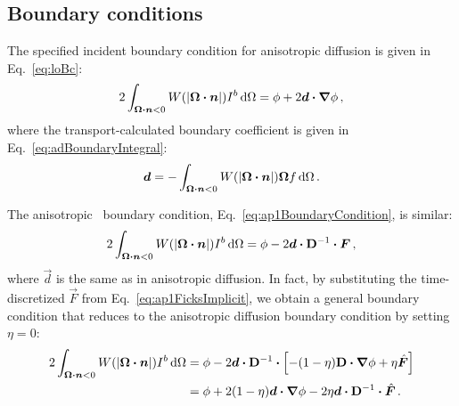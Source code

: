\subsection{Boundary conditions}\label{sec:discreteDiagBc}

The specified incident boundary condition for anisotropic diffusion is given in
Eq.~\eqref{eq:loBc}:
\begin{equation*}
2\int_{\bm{\Omega}\bm{\cdot}\bm{n} < 0} W(\left| \bm{\Omega}\bm{\cdot}\bm{n} \right|)
I^b \mathop{}\!\mathrm{d}\Omega
=
\phi
+ 2 \bm{d} \bm{\cdot} \bm{\nabla} \phi\,,
\end{equation*}
where the transport-calculated boundary coefficient is given in
Eq.~\eqref{eq:adBoundaryIntegral}:
\begin{equation*}
  \bm{d} = -\int_{\bm{\Omega}\bm{\cdot}\bm{n} < 0} W(\left| \bm{\Omega}\bm{\cdot}\bm{n} \right|)
\bm{\Omega} f \mathop{}\!\mathrm{d}\Omega\,.
\end{equation*}

The anisotropic \Pone\ boundary condition, Eq.~\eqref{eq:ap1BoundaryCondition},
is similar:
\begin{equation*}
  2 \int_{\bm{\Omega}\bm{\cdot}\bm{n} < 0}
  W(\left| \bm{\Omega}\bm{\cdot}\bm{n} \right|) I^b \mathop{}\!\mathrm{d}\Omega
  = \phi
  - 2 \bm{d} \bm{\cdot} \mathbf{D}^{-1} \bm{\cdot} \bm{F} \,,
\end{equation*}
where $\vec{d}$ is the same as in anisotropic diffusion.
In fact, by substituting the time-discretized $\vec{F}$ from
Eq.~\eqref{eq:ap1FicksImplicit}, we obtain a general boundary condition that
reduces to the anisotropic diffusion boundary condition by setting $\eta=0$:
\begin{align*}
  2 \int_{\bm{\Omega}\bm{\cdot}\bm{n} < 0}
  W(\left| \bm{\Omega}\bm{\cdot}\bm{n} \right|) I^b \mathop{}\!\mathrm{d}\Omega
  &= \phi
  - 2 \bm{d} \bm{\cdot} \mathbf{D}^{-1} \bm{\cdot} 
  \left[ - (1 - \eta)\mathbf{D} \bm{\cdot} \bm{\nabla} \phi + \eta \hat{\bm{F}} \right]
  \\
  &=  \phi + 2 (1 - \eta) \bm{d} \bm{\cdot} \bm{\nabla} \phi
  - 2 \eta \bm{d} \bm{\cdot} \mathbf{D}^{-1} \bm{\cdot} \hat{\bm{F}} \,.
\end{align*}

